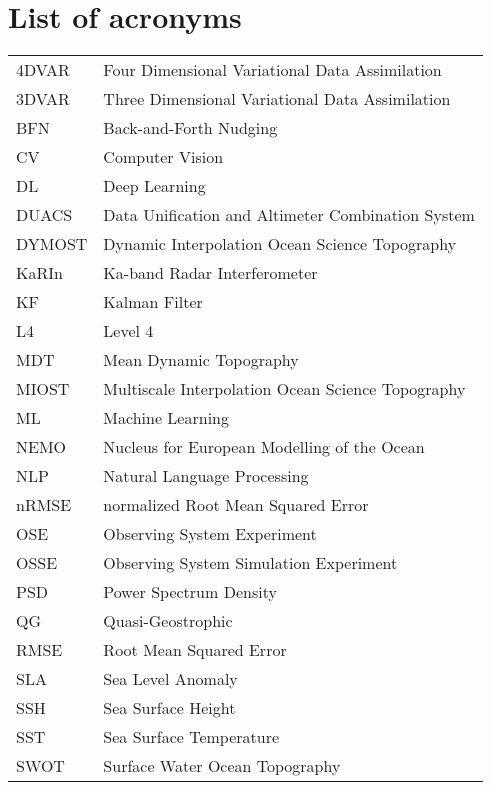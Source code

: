 \chapter*{List of acronyms}


\begin{tabular}{ll}
4DVAR & Four Dimensional Variational Data Assimilation\\
3DVAR & Three Dimensional Variational Data Assimilation\\
BFN & Back-and-Forth Nudging\\
CV  & Computer Vision\\
DL & Deep Learning \\
DUACS & Data Unification and Altimeter Combination System\\
DYMOST & Dynamic Interpolation Ocean Science Topography\\
KaRIn & Ka-band Radar Interferometer\\
KF & Kalman Filter \\
L4 & Level 4\\
MDT & Mean Dynamic Topography\\
MIOST & Multiscale Interpolation Ocean Science Topography\\
ML & Machine Learning\\
NEMO & Nucleus for European Modelling of the Ocean\\
NLP &  Natural Language Processing\\
nRMSE & normalized Root Mean Squared Error\\
OSE  & Observing System Experiment\\
OSSE  & Observing System Simulation Experiment\\
PSD & Power Spectrum Density\\
QG & Quasi-Geostrophic\\
RMSE & Root Mean Squared Error\\
SLA & Sea Level Anomaly\\
SSH & Sea Surface Height\\
SST & Sea Surface Temperature\\
SWOT &  Surface Water Ocean Topography \\



\end{tabular}
